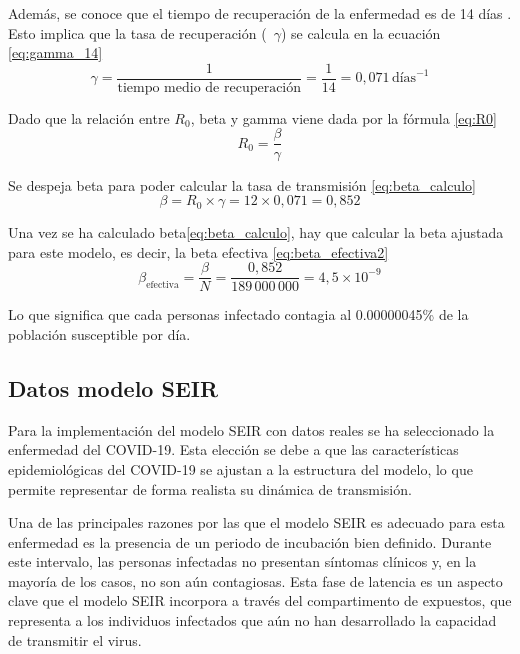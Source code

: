 Además, se conoce que el tiempo de recuperación de la enfermedad es de 14 días \cite{ops_sarampion}. Esto implica que la tasa de recuperación (~$\gamma$) se calcula en la ecuación \eqref{eq:gamma_14}
\begin{equation}
\gamma = \frac{1}{\text{tiempo medio de recuperación}} = \frac{1}{14} = 0{,}071 \,\text{días}^{-1}
\label{eq:gamma_14}
\end{equation}

Dado que la relación entre $R_0$, beta y gamma viene dada por la fórmula \eqref{eq:R0}
\begin{equation}
R_0 = \frac{\beta}{\gamma}
\label{eq:R0}
\end{equation}

Se despeja beta para poder calcular la tasa de transmisión \eqref{eq:beta_calculo}
\begin{equation}
\beta = R_0 \times \gamma = 12 \times 0{,}071 = 0{,}852
\label{eq:beta_calculo}
\end{equation}

Una vez se ha calculado beta\eqref{eq:beta_calculo}, hay que calcular la beta ajustada para este modelo, es decir, la beta efectiva \eqref{eq:beta_efectiva2}
\begin{equation}
\beta_{\text{efectiva}} = \frac{\beta}{N} = \frac{0{,}852}{189\,000\,000} = 4{,}5 \times 10^{-9}
\label{eq:beta_efectiva2}
\end{equation}

Lo que significa que cada personas infectado contagia al 0.00000045\% de la población susceptible por día.

\subsection{Datos modelo SEIR}
Para la implementación del modelo SEIR con datos reales se ha seleccionado la enfermedad del COVID-19. Esta elección se debe a que las características epidemiológicas del COVID-19 se ajustan a la estructura del modelo, lo que permite representar de forma realista su dinámica de transmisión.

Una de las principales razones por las que el modelo SEIR es adecuado para esta enfermedad es la presencia de un periodo de incubación bien definido. Durante este intervalo, las personas infectadas no presentan síntomas clínicos y, en la mayoría de los casos, no son aún contagiosas. Esta fase de latencia es un aspecto clave que el modelo SEIR incorpora a través del compartimento de expuestos, que representa a los individuos infectados que aún no han desarrollado la capacidad de transmitir el virus.

